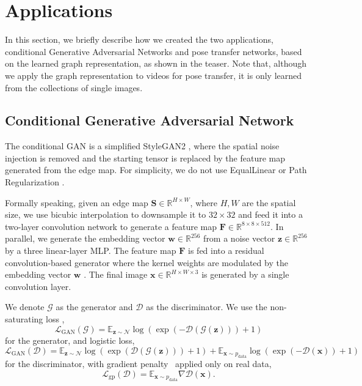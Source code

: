 \documentclass{article}
\newcommand{\R}{\mathbb{R}}
\newcommand{\vw}{\mathbf{w}}
\newcommand{\vx}{\mathbf{x}}
\newcommand{\vz}{\mathbf{z}}
\newcommand{\mF}{\mathbf{F}}
\newcommand{\mS}{\mathbf{S}}
\newcommand{\cD}{\mathcal D}
\newcommand{\cG}{\mathcal G}
\newcommand{\cL}{\mathcal L}
\newcommand{\cN}{\mathcal N}
\begin{document}
\section{Applications}
In this section, we briefly describe how we created the two applications, conditional Generative Adversarial Networks and pose transfer networks, based on the learned graph representation, as shown in the teaser. Note that, although we apply the graph representation to videos for pose transfer, it is only learned from the collections of single images.

\subsection{Conditional Generative Adversarial Network}
The conditional GAN is a simplified StyleGAN2 \cite{karras2020analyzing}, where the spatial noise injection is removed and the starting tensor is replaced by the feature map generated from the edge map. For simplicity, we do not use EqualLinear \cite{karras2019style} or Path Regularization \cite{karras2019style}.

Formally speaking, given an edge map $\mS\in\R^{H\times W}$, where $H, W$ are the spatial size, we use bicubic interpolation to downsample it to $32\times 32$ and feed it into a two-layer convolution network to generate a feature map $\mF\in\R^{8\times 8\times 512}$. In parallel, we generate the embedding vector $\vw\in\R^{256}$ from a noise vector $\vz\in\R^{256}$ by a three linear-layer MLP. The feature map $\mF$ is fed into a residual convolution-based generator where the kernel weights are modulated by the embedding vector $\vw$ \cite{karras2020analyzing}. The final image $\vx\in\R^{H\times W\times 3}$ is generated by a single convolution layer.

We denote $\cG$ as the generator and $\cD$ as the discriminator. We use the non-saturating loss \cite{goodfellow2014generative},
\begin{equation}
    \cL_\text{GAN}(\cG)=\mathbb E_{\vz\sim\cN}\log(\exp(-\cD(\cG(\vz)))+1)
\label{eq:gen_loss}
\end{equation}
for the generator, and logistic loss,
\begin{equation}
        \cL_\text{GAN}(\cD)=\mathbb E_{\vz\sim\cN}\log(\exp(\cD(\cG(\vz)))+1)+\mathbb E_{\vx\sim p_\text{data}}\log(\exp(-\cD(\vx))+1)
    \label{eq:dis_loss}
\end{equation}
for the discriminator, with gradient penalty~\cite{mescheder2018training} applied only on real data,
\begin{equation}
    \cL_\text{gp}(\cD)=\mathbb E_{\vx\sim p_\text{data}}\nabla\cD(\vx).
\label{eq:gradient penalty}
\end{equation}
\end{document}
